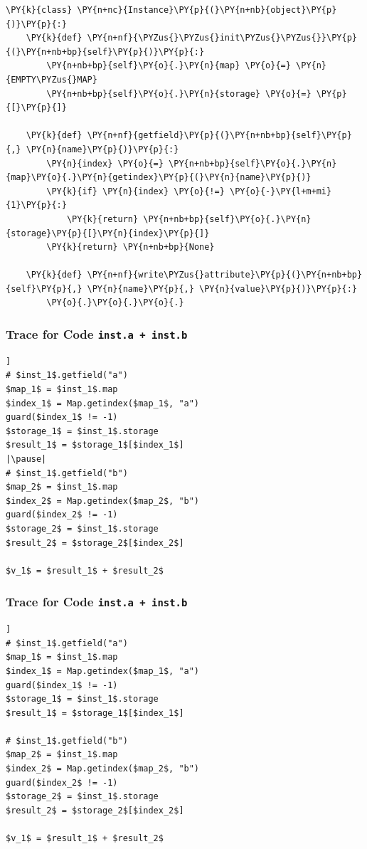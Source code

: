 \documentclass[utf8x]{beamer}
\begin{document}
\begin{frame}
\begin{Verbatim}[commandchars=\\\{\}]
\PY{k}{class} \PY{n+nc}{Instance}\PY{p}{(}\PY{n+nb}{object}\PY{p}{)}\PY{p}{:}
    \PY{k}{def} \PY{n+nf}{\PYZus{}\PYZus{}init\PYZus{}\PYZus{}}\PY{p}{(}\PY{n+nb+bp}{self}\PY{p}{)}\PY{p}{:}
        \PY{n+nb+bp}{self}\PY{o}{.}\PY{n}{map} \PY{o}{=} \PY{n}{EMPTY\PYZus{}MAP}
        \PY{n+nb+bp}{self}\PY{o}{.}\PY{n}{storage} \PY{o}{=} \PY{p}{[}\PY{p}{]}

    \PY{k}{def} \PY{n+nf}{getfield}\PY{p}{(}\PY{n+nb+bp}{self}\PY{p}{,} \PY{n}{name}\PY{p}{)}\PY{p}{:}
        \PY{n}{index} \PY{o}{=} \PY{n+nb+bp}{self}\PY{o}{.}\PY{n}{map}\PY{o}{.}\PY{n}{getindex}\PY{p}{(}\PY{n}{name}\PY{p}{)}
        \PY{k}{if} \PY{n}{index} \PY{o}{!=} \PY{o}{-}\PY{l+m+mi}{1}\PY{p}{:}
            \PY{k}{return} \PY{n+nb+bp}{self}\PY{o}{.}\PY{n}{storage}\PY{p}{[}\PY{n}{index}\PY{p}{]}
        \PY{k}{return} \PY{n+nb+bp}{None}

    \PY{k}{def} \PY{n+nf}{write\PYZus{}attribute}\PY{p}{(}\PY{n+nb+bp}{self}\PY{p}{,} \PY{n}{name}\PY{p}{,} \PY{n}{value}\PY{p}{)}\PY{p}{:}
        \PY{o}{.}\PY{o}{.}\PY{o}{.}
\end{Verbatim}
\end{frame}

\begin{frame}
\frametitle{Trace for Code \texttt{inst.a + inst.b}}
\begin{lstlisting}[mathescape,escapechar=|,basicstyle=\ttfamily]]
# $inst_1$.getfield("a")
$map_1$ = $inst_1$.map
$index_1$ = Map.getindex($map_1$, "a")
guard($index_1$ != -1)
$storage_1$ = $inst_1$.storage
$result_1$ = $storage_1$[$index_1$]
|\pause|
# $inst_1$.getfield("b")
$map_2$ = $inst_1$.map
$index_2$ = Map.getindex($map_2$, "b")
guard($index_2$ != -1)
$storage_2$ = $inst_1$.storage
$result_2$ = $storage_2$[$index_2$]

$v_1$ = $result_1$ + $result_2$
\end{lstlisting}
\end{frame}

\begin{frame}
\frametitle{Trace for Code \texttt{inst.a + inst.b}}
\begin{lstlisting}[mathescape,escapechar=|,basicstyle=\ttfamily]]
# $inst_1$.getfield("a")
$map_1$ = $inst_1$.map
$index_1$ = Map.getindex($map_1$, "a")
guard($index_1$ != -1)
$storage_1$ = $inst_1$.storage
$result_1$ = $storage_1$[$index_1$]

# $inst_1$.getfield("b")
$map_2$ = $inst_1$.map
$index_2$ = Map.getindex($map_2$, "b")
guard($index_2$ != -1)
$storage_2$ = $inst_1$.storage
$result_2$ = $storage_2$[$index_2$]

$v_1$ = $result_1$ + $result_2$
\end{lstlisting}
\end{frame}
\end{document}
